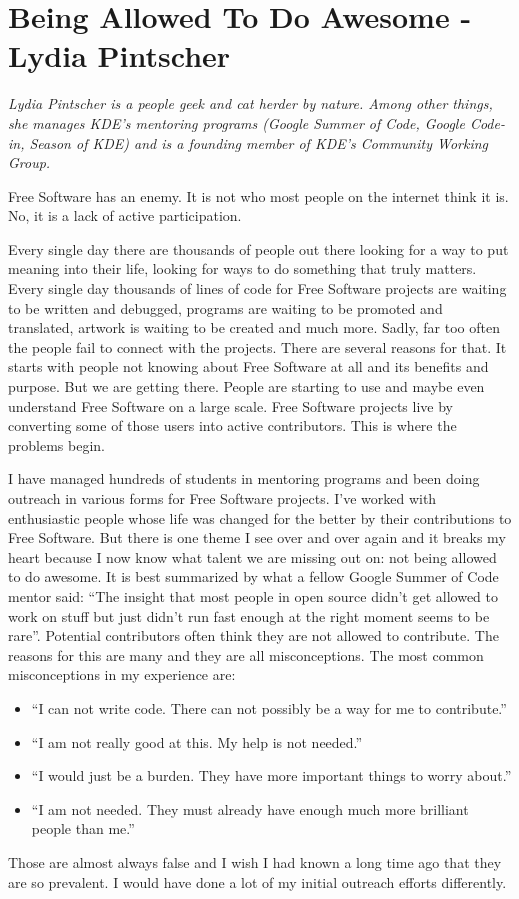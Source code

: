 \chapter{Being Allowed To Do Awesome - Lydia Pintscher}

\textit{Lydia Pintscher is a people geek and cat herder by nature. Among other things, she manages KDE's mentoring programs (Google Summer of Code, Google Code-in, Season of KDE) and is a founding member of KDE's Community Working Group.}

Free Software has an enemy. It is not who most people on the internet think it is. No, it is a lack of active participation.

Every single day there are thousands of people out there looking for a way to put meaning into their life, looking for ways to do something that truly matters. Every single day thousands of lines of code for Free Software projects are waiting to be written and debugged, programs are waiting to be promoted and translated, artwork is waiting to be created and much more. Sadly, far too often the people fail to connect with the projects. There are several reasons for that. It starts with people not knowing about Free Software at all and its benefits and purpose. But we are getting there. People are starting to use and maybe even understand Free Software on a large scale. Free Software projects live by converting some of those users into active contributors. This is where the problems begin.

I have managed hundreds of students in mentoring programs and been doing outreach in various forms for Free Software projects. I've worked with enthusiastic people whose life was changed for the better by their contributions to Free Software. But there is one theme I see over and over again and it breaks my heart because I now know what talent we are missing out on: not being allowed to do awesome. It is best summarized by what a fellow Google Summer of Code mentor said: ``The insight that most people in open source didn’t get allowed to work on stuff but just didn’t run fast enough at the right moment seems to be rare''. Potential contributors often think they are not allowed to contribute. The reasons for this are many and they are all misconceptions. The most common misconceptions in my experience are:
\begin{itemize}
 \item ``I can not write code. There can not possibly be a way for me to contribute.''
 \item ``I am not really good at this. My help is not needed.''
 \item ``I would just be a burden. They have more important things to worry about.''
 \item ``I am not needed. They must already have enough much more brilliant people than me.''
\end{itemize}
Those are almost always false and I wish I had known a long time ago that they are so prevalent. I would have done a lot of my initial outreach efforts differently.

